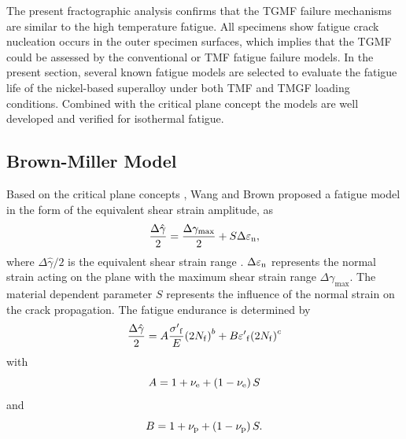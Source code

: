 \documentclass[preprint,5p,twocolumn,10pt,sort&compress]{elsarticle}
\begin{document}
The present fractographic analysis confirms that the TGMF failure mechanisms are similar to the high temperature fatigue. All specimens show fatigue crack nucleation occurs in the outer specimen surfaces, which implies that the TGMF could be assessed by the conventional or TMF fatigue failure models. In the present section, several known fatigue models are selected to evaluate the fatigue life of the nickel-based superalloy under both TMF and TMGF loading conditions. Combined with the critical plane concept the models are well developed and verified for isothermal fatigue.


\subsection{Brown-Miller Model}
{Based on the critical plane concepts \cite{Brown2006}, Wang and Brown \cite{Wang1993} proposed a  fatigue model in the form of the equivalent shear strain amplitude}, as
\begin{equation}
\frac{{\Delta \hat \gamma }}{2} = \frac{{\Delta {\gamma _{\max}}}}{2} + S\Delta {\varepsilon _{\rm n}},
\label{Equ:ShearStrainBM}
\end{equation}
where ${{\Delta \hat \gamma }}/{2}$ is the equivalent shear strain range \cite{Wang1993}. $\Delta {\varepsilon _{\rm n}}$ represents the normal strain acting on the plane with the maximum shear strain range $\Delta {\gamma _{\max}}$. The material dependent parameter $S$ represents the influence of the normal strain on the crack propagation.
The fatigue endurance is determined by 
\begin{equation}
\frac{{\Delta \hat \gamma }}{2} = A\frac{{{{\sigma '}_{\rm f}}}}{E}{\left( {2{N_{\rm f}}} \right)^b} + B{{\varepsilon '}_{\rm f}}{\left( {2{N_{\rm f}}} \right)^c}
\end{equation}
with
\[A = 1 + {\nu _{\rm e}} + \left( {1 - {\nu _{\rm e}}} \right)S\]
and
\[B = 1 + {\nu _{\rm p}} + \left( {1 - {\nu _{\rm p}}} \right)S.\]
\end{document}

